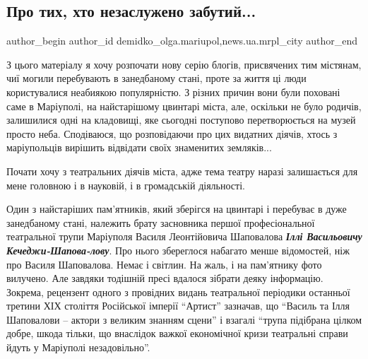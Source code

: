  
 
 
 
 
 
\subsection{Про тих, хто незаслужено забутий...}
\label{sec:14_11_2021.stz.news.ua.mrpl_city.1.pro_tyh_hto_nezasluzheno_zabutyj}
 
\ifcmt
 author_begin
   author_id demidko_olga.mariupol,news.ua.mrpl_city
 author_end
\fi

З цього матеріалу я хочу розпочати нову серію блогів, присвячених тим містянам,
чиї могили перебувають в занедбаному стані, проте за життя ці люди
користувалися неабиякою популярністю. З різних причин вони були поховані саме в
Маріуполі, на найстарішому цвинтарі міста, але, оскільки не було родичів,
залишилися одні на кладовищі, яке сьогодні поступово перетворюється на музей
просто неба. Сподіваюся, що розповідаючи про цих видатних діячів, хтось з
маріупольців вирішить відвідати своїх знаменитих земляків...

Почати хочу з театральних діячів міста, адже тема театру наразі залишається для
мене головною і в науковій, і в громадській діяльності.


Один з найстаріших пам'ятників, який зберігся на цвинтарі і перебуває в дуже
занедбаному стані, належить брату засновника першої професіональної театральної
трупи Маріуполя Василя Леонтійовича Шаповалова  \emph{\textbf{Іллі Васильовичу
Кечеджи-Шапова\hyp{}лову}}. Про нього збереглося набагато менше відомостей, ніж про
Василя Шаповалова. Немає і світлин. На жаль, і на пам'ятнику фото вилучено. Але
завдяки тодішній пресі вдалося зібрати деяку інформацію. Зокрема, рецензент
одного з провідних видань театральної періодики останньої третини ХІХ століття
Російської імперії \enquote{Артист} зазначав, що \enquote{Василь та Ілля Шаповалови – актори з
великим знанням сцени} і взагалі \enquote{трупа підібрана цілком добре, шкода тільки,
що внаслідок важкої економічної кризи театральні справи йдуть у Маріуполі
незадовільно}.

